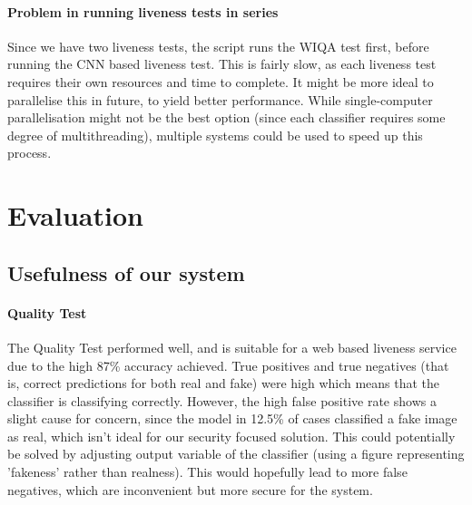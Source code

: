 \documentclass[12pt,a4paper]{article}
\begin{document}
\begin{multicols}{2}
            \paragraph{Problem in running liveness tests in series}
                Since we have two liveness tests, the script runs the WIQA test first, before running the CNN based liveness test. This is fairly slow, as each liveness test requires their
                own resources and time to complete. It might be more ideal to parallelise this in future, to yield better performance. While single-computer parallelisation might not be the best option
                (since each classifier requires some degree of multithreading), multiple systems could be used to speed up this process.
    
        \end{multicols}
      
\section{Evaluation}
    \subsection{Usefulness of our system}
    
        \paragraph{Quality Test}
            The Quality Test performed well, and is suitable for a web based liveness service due to the high 87\% accuracy achieved.
            True positives and true negatives (that is, correct predictions for both real and fake) were high which means that the classifier
            is classifying correctly. However, the high false positive rate shows a slight cause for concern, since the model in 12.5\% of cases
            classified a fake image as real, which isn't ideal for our security focused solution. This could potentially be solved by adjusting output
            variable of the classifier (using a figure representing 'fakeness' rather than realness). This would hopefully lead to more false negatives,
            which are inconvenient but more secure for the system.
\end{document}

